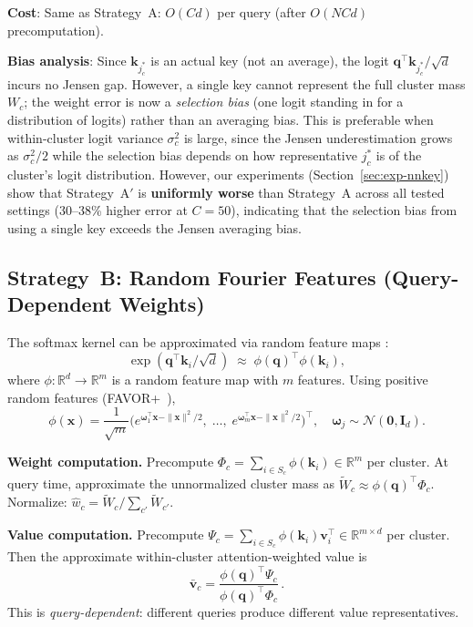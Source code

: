 \documentclass[11pt,a4paper]{article}
\theoremstyle{definition}
\newcommand{\vv}{\mathbf{v}}
\newcommand{\kk}{\mathbf{k}}
\newcommand{\qq}{\mathbf{q}}
\begin{document}
\textbf{Cost}: Same as Strategy~A: $O(Cd)$ per query (after $O(NCd)$
precomputation).

\textbf{Bias analysis}: Since $\kk_{j_c^*}$ is an actual key (not an
average), the logit $\qq^{\!\top}\kk_{j_c^*}/\sqrt{d}$ incurs no Jensen
gap.  However, a single key cannot represent the full cluster mass $W_c$;
the weight error is now a \emph{selection bias} (one logit standing in for
a distribution of logits) rather than an averaging bias.  This is preferable
when within-cluster logit variance $\sigma_c^2$ is large, since the Jensen
underestimation grows as $\sigma_c^2/2$ while the selection bias depends on
how representative $j_c^*$ is of the cluster's logit distribution.
However, our experiments (Section~\ref{sec:exp-nnkey}) show that Strategy~A$'$
is \textbf{uniformly worse} than Strategy~A across all tested settings (30--38\%
higher error at $C=50$), indicating that the selection bias from using a single
key exceeds the Jensen averaging bias.

\subsection{Strategy~B: Random Fourier Features (Query-Dependent Weights)}
\label{sec:strat-rff}

The softmax kernel can be approximated via random feature maps
\cite{rahimi2007random,choromanski2021rethinking}:
\begin{equation}\label{eq:rff}
  \exp(\qq^{\!\top}\kk_i/\sqrt{d})
  \;\approx\;
  \phi(\qq)^{\!\top}\phi(\kk_i),
\end{equation}
where $\phi:\mathbb{R}^d\to\mathbb{R}^m$ is a random feature map with $m$
features.  Using positive random features (FAVOR+~\cite{choromanski2021rethinking}),
\[
  \phi(\mathbf{x})
  = \frac{1}{\sqrt{m}}
  \bigl(
    e^{\boldsymbol{\omega}_1^{\!\top}\mathbf{x}-\|\mathbf{x}\|^2/2},
    \;\dots,\;
    e^{\boldsymbol{\omega}_m^{\!\top}\mathbf{x}-\|\mathbf{x}\|^2/2}
  \bigr)^{\!\top},
  \quad \boldsymbol{\omega}_j\sim\mathcal{N}(\mathbf{0},\mathbf{I}_d).
\]

\textbf{Weight computation.}
Precompute $\Phi_c = \sum_{i\in S_c}\phi(\kk_i)\in\mathbb{R}^m$ per cluster.
At query time, approximate the unnormalized cluster mass as
$\tilde{W}_c \approx \phi(\qq)^{\!\top}\Phi_c$.
Normalize: $\hat{w}_c = \tilde{W}_c / \sum_{c'}\tilde{W}_{c'}$.

\textbf{Value computation.}
Precompute
$\Psi_c = \sum_{i\in S_c}\phi(\kk_i)\vv_i^{\!\top}\in\mathbb{R}^{m\times d}$
per cluster.  Then the approximate within-cluster attention-weighted value is
\[
  \bar{\vv}_c
  = \frac{\phi(\qq)^{\!\top}\Psi_c}{\phi(\qq)^{\!\top}\Phi_c}\,.
\]
This is \emph{query-dependent}: different queries produce different value
representatives.
\end{document}
